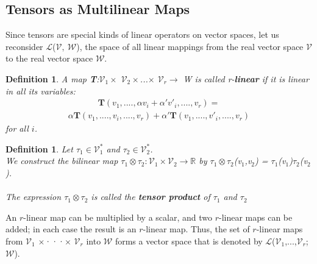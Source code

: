 \documentclass[12pt,a4paper]{article}
\newtheorem{defn}[thm]{Definition}
\begin{document}
\subsection{Tensors as Multilinear Maps}
Since tensors are special kinds of linear operators on vector spaces, let us reconsider $\mathcal{L}$($\mathcal{V},\ \mathcal{W}$), the space of all linear mappings from the real vector space $\mathcal{V}$ to the real vector space $\mathcal{W}$. 
\begin{defn}
A map \textbf{T}:$\mathcal{V}$$_1\times$ $\mathcal{V}$$_2\times $...$\times$ $\mathcal{V}$$_r\to$ W is called r-\textbf{linear} if it is linear in all its variables:
\begin{align*}
\textbf{T}(v_1,....,\alpha v_i + \alpha'v'_i,....,v_r) =  
\end{align*}
\begin{align*}
\alpha\textbf{T}(v_1,....,v_i,....,v_r) + \alpha'\textbf{T}(v_1,....,v'_i,....,v_r)
\end{align*}
for all $i$.
\end{defn}
\begin{defn}
Let $\tau_1\in \mathcal{V}^*_1$ and $\tau_2\in \mathcal{V}^*_2$. \\
We construct the bilinear map $\tau_1\otimes \tau_2:\mathcal{V}_1\times \mathcal{V}_2\to \mathbb{R}$ by $\tau_1\otimes \tau_2$(v$_1$,v$_2$) = $\tau_1$(v$_1$)$\tau_2$(v$_2$). \\\\The expression $\tau_1\otimes \tau_2$ is called the \textbf{tensor product} of $\tau_1$ and $\tau_2$
\end{defn}
An $r$-linear map can be multiplied by a scalar, and two $r$-linear maps can
be added; in each case the result is an $r$-linear map. Thus, the set of $r$-linear
maps from $\mathcal{V}$$_1$ $\times$···$\times$ $\mathcal{V}$$_r$ into $\mathcal{W}$ forms a vector space that is denoted by
$\mathcal{L}$($\mathcal{V}$$_1$,...,$\mathcal{V}$$_r$;$\mathcal{W}$).\\
\end{document}
